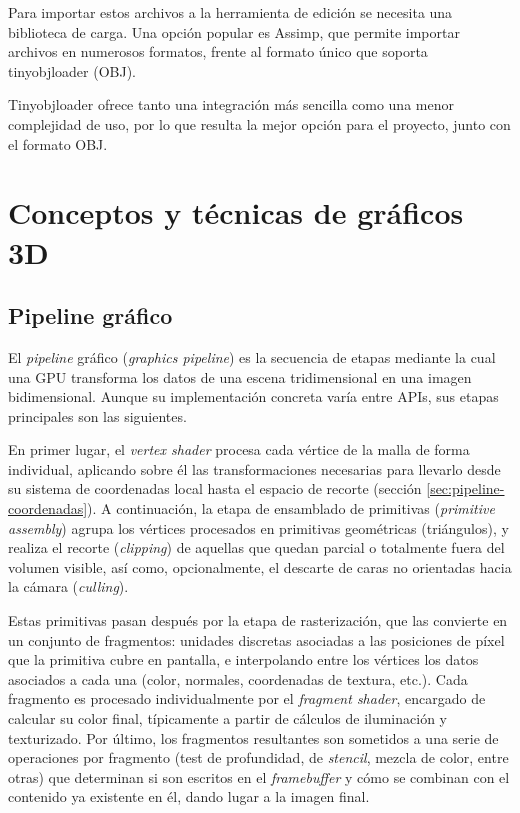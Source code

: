 Para importar estos archivos a la herramienta de edición se necesita una biblioteca de carga. Una opción popular es Assimp, que permite importar archivos en numerosos formatos, frente al formato único que soporta tinyobjloader (OBJ).

Tinyobjloader ofrece tanto una integración más sencilla como una menor complejidad de uso, por lo que resulta la mejor opción para el proyecto, junto con el formato OBJ.

\section{Conceptos y técnicas de gráficos 3D}

\subsection{Pipeline gráfico} \label{sec:pipeline-grafico}

El \textit{pipeline} gráfico (\emph{graphics pipeline}) es la secuencia de etapas mediante la cual una GPU transforma los datos de una escena tridimensional en una imagen bidimensional. Aunque su implementación concreta varía entre APIs, sus etapas principales son las siguientes.

En primer lugar, el \emph{vertex shader} procesa cada vértice de la malla de forma individual, aplicando sobre él las transformaciones necesarias para llevarlo desde su sistema de coordenadas local hasta el espacio de recorte (sección \ref{sec:pipeline-coordenadas}). A continuación, la etapa de ensamblado de primitivas (\emph{primitive assembly}) agrupa los vértices procesados en primitivas geométricas (triángulos), y realiza el recorte (\emph{clipping}) de aquellas que quedan parcial o totalmente fuera del volumen visible, así como, opcionalmente, el descarte de caras no orientadas hacia la cámara (\emph{culling}).

Estas primitivas pasan después por la etapa de rasterización, que las convierte en un conjunto de fragmentos: unidades discretas asociadas a las posiciones de píxel que la primitiva cubre en pantalla, e interpolando entre los vértices los datos asociados a cada una (color, normales, coordenadas de textura, etc.). Cada fragmento es procesado individualmente por el \emph{fragment shader}, encargado de calcular su color final, típicamente a partir de cálculos de iluminación y texturizado. Por último, los fragmentos resultantes son sometidos a una serie de operaciones por fragmento (test de profundidad, de \emph{stencil}, mezcla de color, entre otras) que determinan si son escritos en el \emph{framebuffer} y cómo se combinan con el contenido ya existente en él, dando lugar a la imagen final.

